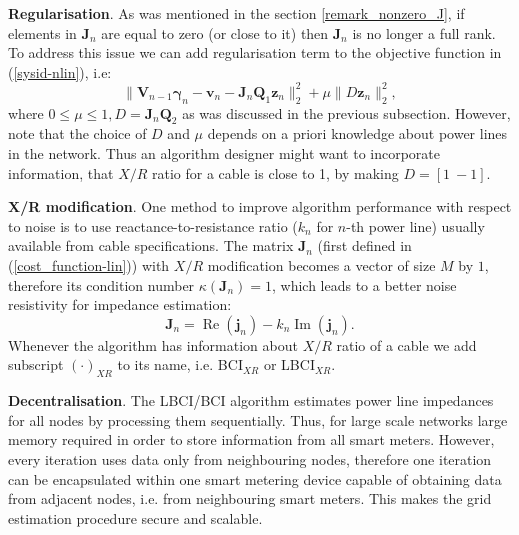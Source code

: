 \documentclass[journal,10pt,onecolumn,draftclsnofoot,]{IEEEtran}
\theoremstyle{plain}
\theoremstyle{definition}
\theoremstyle{remark}
\DeclareMathOperator{\Real}{Re}
\DeclareMathOperator{\Imag}{Im}
\begin{document}
\textbf{Regularisation}. As was mentioned in the section \ref{remark_nonzero_J}, if elements in $\bm{J}_n$ are equal to zero (or close to it) then $\bm{J}_n$ is no longer a full rank. To address this issue we can add regularisation term to the objective function in (\ref{sysid-nlin}), i.e:
$$\Big\| \bm{V}_{n-1}\bm{\gamma}_{n} - \bm{v}_{n} - \bm{J}_{n}\bm{Q}_1\bm{z}_{n} \Big\|_2^2 + \mu\|D\bm{z}_n\|_2^2,$$
where $0 \le \mu \le 1, D = \bm{J}_{n}\bm{Q}_2$ as was discussed in the previous subsection. However, note that the choice of $D$ and $\mu$ depends on a priori knowledge about power lines in the network. Thus an algorithm designer might want to incorporate information, that $X/R$ ratio for a cable is close to 1, by making $D = [1~ -1]$.

\textbf{X/R modification}. One method to improve algorithm performance with respect to noise is to use reactance-to-resistance ratio ($k_n$ for $n$-th power line) usually available from cable specifications. The matrix $\bm{J}_n$ (first defined in (\ref{cost_function-lin})) with $X/R$ modification becomes a vector of size $M$ by $1$, therefore its condition number $\kappa(\bm{J}_n) = 1$, which leads to a better noise resistivity for impedance estimation:
\begin{equation*}
\bm{J}_n = \Real{(\bm{j}_n)} - k_n\Imag{(\bm{j}_n)}.
\end{equation*}
Whenever the algorithm has information about $X/R$ ratio of a cable we add subscript $(\cdot)_{XR}$ to its name, i.e. BCI$_{XR}$ or LBCI$_{XR}$.

\textbf{Decentralisation}. The LBCI/BCI algorithm estimates power line impedances for all nodes by processing them sequentially. Thus, for large scale networks large memory required in order to store information from all smart meters. However, every iteration uses data only from neighbouring nodes, therefore one iteration can be encapsulated within one smart metering device capable of obtaining data from adjacent nodes, i.e. from neighbouring smart meters. This makes the grid estimation procedure secure and scalable.
\end{document}

